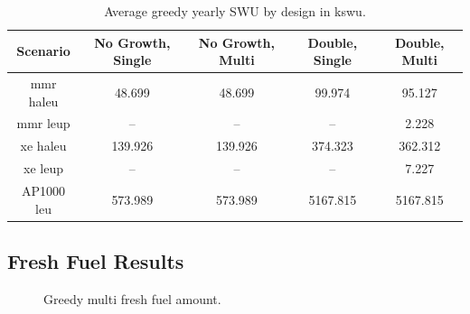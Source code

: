\begin{table}[H]
  \centering
  \caption{Average greedy yearly SWU by design in k\gls{swu}.}
  \label{tab:greedy_swu_avg}
  \begin{tabular}{c c c c c}
     \hline
     Scenario & No Growth, Single & No Growth, Multi & Double, Single & Double, Multi  \\
     \hline
     \gls{mmr} \gls{haleu}   & 48.699  & 48.699  & 99.974   & 95.127   \\
     \gls{mmr} \gls{leup}    & --      & --      & --       & 2.228    \\
     \gls{xe} \gls{haleu}    & 139.926 & 139.926 & 374.323  & 362.312  \\
     \gls{xe} \gls{leup}     & --      & --      & --       & 7.227    \\
     AP1000 \gls{leu}        & 573.989 & 573.989 & 5167.815 & 5167.815 \\
     \hline
  \end{tabular}
\end{table}



\subsection{Fresh Fuel Results}



\begin{figure}[H]
  \hfill
  \caption{Greedy multi fresh fuel amount.}
  \label{fig:greedy_mf_fresh}
\end{figure}

